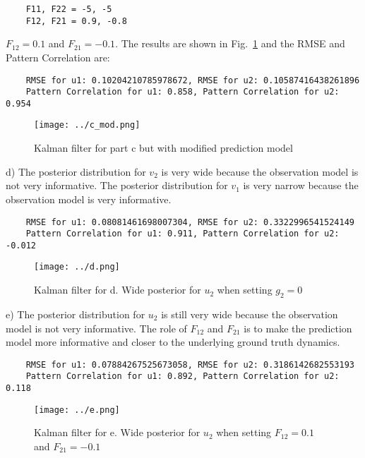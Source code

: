 \documentclass[a4paper,notitlepage,cs4size,cap,indent,oneside,12pt]{article}
\numberwithin{equation}{section}
\numberwithin{figure}{section}
\begin{document}
{\begin{verbatim}
    F11, F22 = -5, -5
    F12, F21 = 0.9, -0.8
\end{verbatim}
$F_{12} = 0.1$ and $F_{21} = -0.1$. The results are shown in Fig.~\ref{fig:c_mod} and the RMSE and Pattern Correlation are:
\begin{verbatim}
    RMSE for u1: 0.10204210785978672, RMSE for u2: 0.10587416438261896
    Pattern Correlation for u1: 0.858, Pattern Correlation for u2: 0.954
\end{verbatim}
\begin{figure}[H]
    \centering
    \texttt{[image: ../c\_mod.png]}
    \caption{Kalman filter for part c but with modified prediction model}
    \label{fig:c_mod}
\end{figure}
d) The posterior distribution for $v_2$ is very wide because the observation model is not very informative. The posterior distribution for $v_1$ is very narrow because the observation model is very informative.\\
\begin{verbatim}
    RMSE for u1: 0.08081461698007304, RMSE for u2: 0.3322996541524149
    Pattern Correlation for u1: 0.911, Pattern Correlation for u2: -0.012
\end{verbatim}
\begin{figure}[H]
    \centering
    \texttt{[image: ../d.png]}
    \caption{Kalman filter for d. Wide posterior for $u_2$ when setting $g_2=0$} 
    \label{fig:d}
\end{figure}
e) The posterior distribution for $u_2$ is still very wide because the observation model is not very informative. The role of $F_{12}$ and $F_{21}$ is to make the prediction model more informative and closer to the underlying ground truth dynamics. \\
\begin{verbatim}
    RMSE for u1: 0.07884267525673058, RMSE for u2: 0.3186142682553193
    Pattern Correlation for u1: 0.892, Pattern Correlation for u2: 0.118
\end{verbatim}
\begin{figure}[H]
    \centering
    \texttt{[image: ../e.png]}
    \caption{Kalman filter for e. Wide posterior for $u_2$ when setting $F_{12} = 0.1$ and $F_{21} = -0.1$} 
    \label{fig:e}
\end{figure}
}
\end{document}
